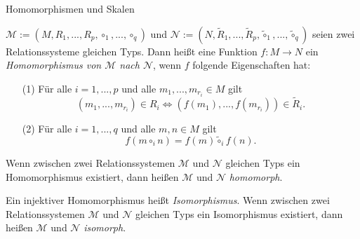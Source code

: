 \documentclass[
  8pt,
  ignorenonframetext,
]{beamer}
\begin{document}
\begin{frame}{Homomorphismen und Skalen}
\protect\hypertarget{homomorphismen-und-skalen}{}
\small
\begin{definition}[Homomorphismus]
\justifying
$\mathcal{M} := (M,R_1,...,R_p, \circ_1, ...,\circ_q)$ und
$\mathcal{N} := (N,\tilde{R}_1,...,\tilde{R}_p, \tilde{\circ}_1, ...,\tilde{\circ}_q)$
seien zwei Relationssysteme gleichen Typs. Dann heißt eine Funktion $f : M \to N$
ein \textit{Homomorphismus von $\mathcal{M}$ nach $\mathcal{N}$}, wenn $f$ folgende
Eigenschaften hat:
\begin{itemize}
\item[(1)] Für alle $i = 1,...,p$ und alle $m_1,...,m_{r_i} \in M$ gilt
\begin{equation}
(m_1,...,m_{r_i}) \in R_i \Leftrightarrow (f(m_1),...,f(m_{r_i})) \in \tilde{R}_i.
\end{equation}
\item[(2)] Für alle $i = 1,...,q$ und alle $m,n\in M$ gilt
\begin{equation}
f(m \circ_i n) = f(m) \tilde{\circ}_i f(n).
\end{equation}
\end{itemize}
Wenn zwischen zwei Relationssystemen $\mathcal{M}$ und $\mathcal{N}$ gleichen Typs
ein Homomorphismus existiert, dann heißen $\mathcal{M}$ und $\mathcal{N}$ \textit{homomorph}.
\end{definition}

\begin{definition}[Isomorphismus]
Ein injektiver Homomorphismus heißt \textit{Isomorphismus}. Wenn zwischen zwei
Relationssystemen $\mathcal{M}$ und $\mathcal{N}$ gleichen Typs ein Isomorphismus
existiert, dann heißen $\mathcal{M}$ und $\mathcal{N}$ \textit{isomorph}.
\end{definition}
\end{frame}
\end{document}
